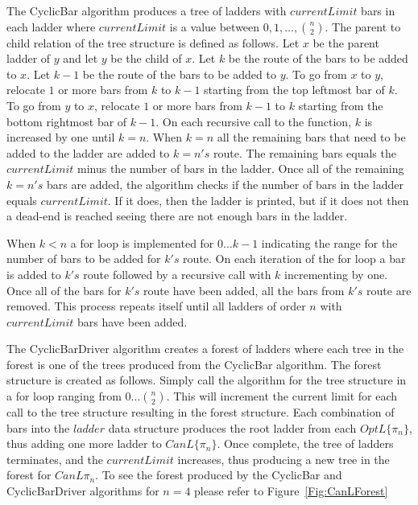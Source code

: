 The {\sc CyclicBar} algorithm produces a tree of ladders with $currentLimit$ bars in each ladder where $currentLimit$
is a value between $0,1, \dots, {n \choose 2}$. The parent to child relation of the tree structure 
is defined as follows. Let $x$ be the parent ladder of $y$ and let $y$ be the 
child of $x$. Let $k$ be the route of the bars to be added to $x$. Let $k-1$ be 
the route of the bars to be added to $y$. To go from $x$  
to $y$, relocate $1$ or more bars from $k$ to $k-1$ starting from 
the top leftmost bar of $k$. To go from $y$ to $x$, 
relocate $1$ or more bars from $k-1$ to $k$ starting 
from the bottom rightmost bar of $k-1$. 
On each recursive call to the function, $k$ is increased by one until $k=n$. When $k=n$ all the remaining bars that need to 
be added to the ladder are added to $k=n's$ route. The remaining bars equals the $currentLimit$ minus the number of bars in the ladder.
Once all of the remaining $k=n's$ bars are added, the algorithm 
checks if the number of bars in the ladder equals $currentLimit$. If it does, then the ladder is printed, but if it 
does not then a dead-end is reached seeing there are not enough bars in the ladder.\par 
When $k < n$ a for loop is implemented for $0 \dots k-1$ indicating the range for the number of bars 
to be added for $k's$ route. On each iteration of the for loop a bar is added to $k's$ route followed by a 
recursive call with $k$ incrementing by one. Once all of the bars for $k's$ route have been added, all 
the bars from $k's$ route are removed. This process repeats itself until all ladders of order $n$ with 
$currentLimit$ bars have been added.\par  
The {\sc CyclicBarDriver} algorithm creates a forest of ladders where each tree in the forest is 
one of the trees produced from the {\sc CyclicBar} algorithm.
The forest structure is created as follows. Simply call the algorithm for the tree structure in a for loop 
ranging from $0 \dots {n \choose 2}$. This will increment the current limit for each call to the tree structure 
resulting in the forest structure.
Each combination of bars into the $ladder$ 
data structure produces the root ladder from each $OptL\{\pi_{n}\}$, thus adding one more ladder to $CanL\{\pi_{n}\}$.
Once complete, the tree of ladders terminates, and the $currentLimit$ increases, thus producing a new tree in the forest for 
$CanL{\pi_{n}}$. To see the forest produced by the {\sc CyclicBar} and {\sc CyclicBarDriver} algorithms for $n=4$ please refer to 
Figure~\ref{Fig:CanLForest}\pagebreak
